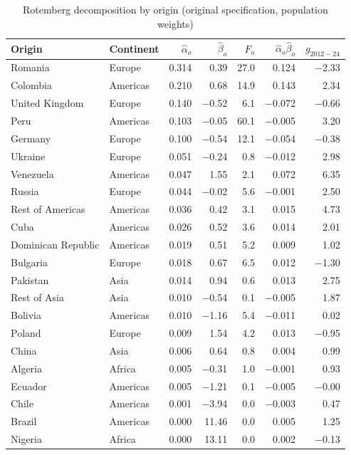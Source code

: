 \begin{table}[!htbp]\centering\scriptsize
\caption{Rotemberg decomposition by origin (original specification, population weights)}\label{tab:rotfull}
\begin{tabular}{llrrrrr}\toprule
Origin & Continent & $\hat\alpha_o$ & $\hat\beta_o$ & $F_o$ & $\hat\alpha_o\hat\beta_o$ & $g_{2012-24}$\\\midrule
Romania & Europe & 0.314 & 0.39 & 27.0 & 0.124 & $-$2.33\\
Colombia & Americas & 0.210 & 0.68 & 14.9 & 0.143 & 2.34\\
United Kingdom & Europe & 0.140 & $-$0.52 & 6.1 & $-$0.072 & $-$0.66\\
Peru & Americas & 0.103 & $-$0.05 & 60.1 & $-$0.005 & 3.20\\
Germany & Europe & 0.100 & $-$0.54 & 12.1 & $-$0.054 & $-$0.38\\
Ukraine & Europe & 0.051 & $-$0.24 & 0.8 & $-$0.012 & 2.98\\
Venezuela & Americas & 0.047 & 1.55 & 2.1 & 0.072 & 6.35\\
Russia & Europe & 0.044 & $-$0.02 & 5.6 & $-$0.001 & 2.50\\
Rest of Americas & Americas & 0.036 & 0.42 & 3.1 & 0.015 & 4.73\\
Cuba & Americas & 0.026 & 0.52 & 3.6 & 0.014 & 2.01\\
Dominican Republic & Americas & 0.019 & 0.51 & 5.2 & 0.009 & 1.02\\
Bulgaria & Europe & 0.018 & 0.67 & 6.5 & 0.012 & $-$1.30\\
Pakistan & Asia & 0.014 & 0.94 & 0.6 & 0.013 & 2.75\\
Rest of Asia & Asia & 0.010 & $-$0.54 & 0.1 & $-$0.005 & 1.87\\
Bolivia & Americas & 0.010 & $-$1.16 & 5.4 & $-$0.011 & 0.02\\
Poland & Europe & 0.009 & 1.54 & 4.2 & 0.013 & $-$0.95\\
China & Asia & 0.006 & 0.64 & 0.8 & 0.004 & 0.99\\
Algeria & Africa & 0.005 & $-$0.31 & 1.0 & $-$0.001 & 0.93\\
Ecuador & Americas & 0.005 & $-$1.21 & 0.1 & $-$0.005 & $-$0.00\\
Chile & Americas & 0.001 & $-$3.94 & 0.0 & $-$0.003 & 0.47\\
Brazil & Americas & 0.000 & 11.46 & 0.0 & 0.005 & 1.25\\
Nigeria & Africa & 0.000 & 13.11 & 0.0 & 0.002 & $-$0.13\\

\end{tabular}
\end{table}

